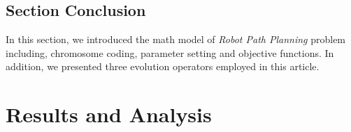 \documentclass[a4paper, 11pt]{article}
\begin{document}
\subsection{Section Conclusion}
In this section, we introduced the math model of \emph{Robot Path Planning} problem including, chromosome coding, parameter setting and objective functions. In addition, we presented three evolution operators employed in this article.


\newpage

\section{Results and Analysis}

\end{document}
